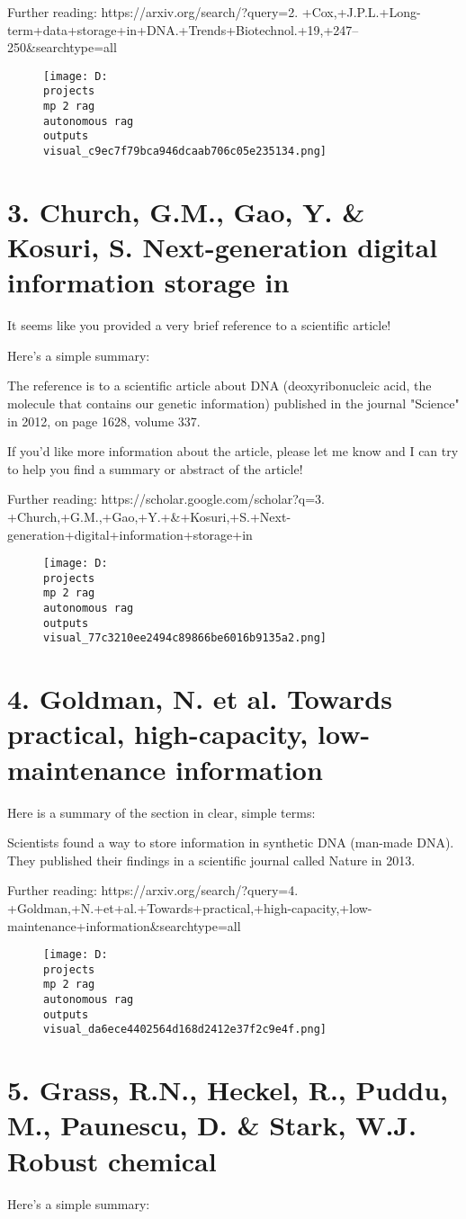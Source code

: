 \documentclass[12pt,a4paper]{article}
\begin{document}
Further reading: https://arxiv.org/search/?query=2.	+Cox,+J.P.L.+Long-term+data+storage+in+DNA.+Trends+Biotechnol.+19,+247–250&searchtype=all
\begin{figure}[h]
\centering
\texttt{[image: D:\\projects\\mp 2 rag\\autonomous rag\\outputs\\visual\_c9ec7f79bca946dcaab706c05e235134.png]}
\end{figure}
\section{3.	 Church, G.M., Gao, Y. & Kosuri, S. Next-generation digital information storage in}
It seems like you provided a very brief reference to a scientific article!

Here's a simple summary:

The reference is to a scientific article about DNA (deoxyribonucleic acid, the molecule that contains our genetic information) published in the journal "Science" in 2012, on page 1628, volume 337.

If you'd like more information about the article, please let me know and I can try to help you find a summary or abstract of the article!

Further reading: https://scholar.google.com/scholar?q=3.	+Church,+G.M.,+Gao,+Y.+&+Kosuri,+S.+Next-generation+digital+information+storage+in
\begin{figure}[h]
\centering
\texttt{[image: D:\\projects\\mp 2 rag\\autonomous rag\\outputs\\visual\_77c3210ee2494c89866be6016b9135a2.png]}
\end{figure}
\section{4.	 Goldman, N. et al. Towards practical, high-capacity, low-maintenance information}
Here is a summary of the section in clear, simple terms:

Scientists found a way to store information in synthetic DNA (man-made DNA). They published their findings in a scientific journal called Nature in 2013.

Further reading: https://arxiv.org/search/?query=4.	+Goldman,+N.+et+al.+Towards+practical,+high-capacity,+low-maintenance+information&searchtype=all
\begin{figure}[h]
\centering
\texttt{[image: D:\\projects\\mp 2 rag\\autonomous rag\\outputs\\visual\_da6ece4402564d168d2412e37f2c9e4f.png]}
\end{figure}
\section{5.	 Grass, R.N., Heckel, R., Puddu, M., Paunescu, D. & Stark, W.J. Robust chemical}
Here's a simple summary:
\end{document}
